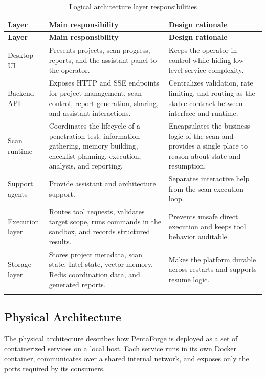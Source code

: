 \documentclass[12pt,a4paper]{report}
\begin{document}
\begin{longtable}{|p{}|p{}|p{}|}
\hline
\textbf{Layer} & \textbf{Main responsibility} & \textbf{Design rationale} \\
\hline
\endfirsthead
\hline
\textbf{Layer} & \textbf{Main responsibility} & \textbf{Design rationale} \\
\hline
\endhead
Desktop UI & Presents projects, scan progress, reports, and the assistant panel to
the operator. & Keeps the operator in control while hiding low-level service
complexity. \\
\hline
Backend API & Exposes HTTP and SSE endpoints for project management, scan control,
report generation, sharing, and assistant interactions. & Centralizes validation,
rate limiting, and routing as the stable contract between interface and runtime. \\
\hline
Scan runtime & Coordinates the lifecycle of a penetration test: information
gathering, memory building, checklist planning, execution, analysis, and reporting.
& Encapsulates the business logic of the scan and provides a single place to reason
about state and resumption. \\
\hline
Support agents & Provide assistant and architecture support. & Separates interactive
help from the scan execution loop. \\
\hline
Execution layer & Routes tool requests, validates target scope, runs commands in the
sandbox, and records structured results. & Prevents unsafe direct execution and
keeps tool behavior auditable. \\
\hline
Storage layer & Stores project metadata, scan state, Intel state, vector memory,
Redis coordination data, and generated reports. & Makes the platform durable across
restarts and supports resume logic. \\
\hline
\caption{Logical architecture layer responsibilities}
\label{tab:architecture_responsibilities}
\end{longtable}

\subsection{Physical Architecture}

The physical architecture describes how PentaForge is deployed as a set of
containerized services on a local host. Each service runs in its own Docker
container, communicates over a shared internal network, and exposes only the
ports required by its consumers.
\end{document}
